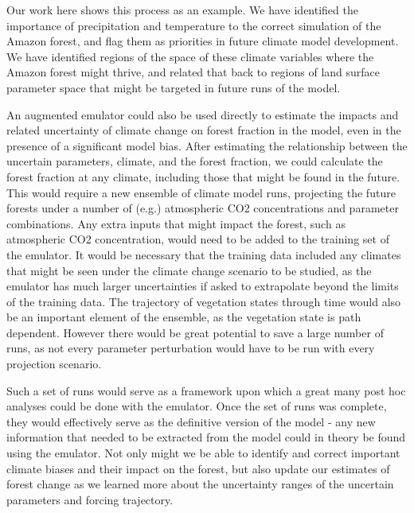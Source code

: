 \documentclass[gmd, manuscript]{copernicus}
\begin{document}
Our work here shows this process as an example. We have identified the importance of precipitation and temperature to the correct simulation of the Amazon forest, and flag them as priorities in future climate model development. We have identified regions of the space of these climate variables where the Amazon forest might thrive, and related that back to regions of land surface parameter space that might be targeted in future runs of the model.

An augmented emulator could also be used directly to estimate the impacts and related uncertainty of climate change on forest fraction in the model, even in the presence of a significant model bias. After estimating the relationship between the uncertain parameters, climate, and the forest fraction, we could calculate the forest fraction at any climate, including those that might be found in the future. This would require a new ensemble of climate model runs, projecting the future forests under a number of (e.g.) atmospheric CO2 concentrations and parameter combinations. Any extra inputs that might impact the forest, such as atmospheric CO2 concentration, would need to be added to the training set of the emulator. It would be necessary that the training data included any climates that might be seen under the climate change scenario to be studied, as the emulator has much larger uncertainties if asked to extrapolate beyond the limits of the training data. The trajectory of vegetation states through time would also be an important element of the ensemble, as the vegetation state is path dependent. However there would be great potential to save a large number of runs, as not every parameter perturbation would have to be run with every projection scenario.

Such a set of runs would serve as a framework upon which a great many post hoc analyses could be done with the emulator. Once the set of runs was complete, they would effectively serve as the definitive version of the model - any new information that needed to be extracted from the model could in theory be found using the emulator. Not only might we be able to identify and correct important climate biases and their impact on the forest, but also update our estimates of forest change as we learned more about the uncertainty ranges of the uncertain  parameters and forcing trajectory.
\end{document}
